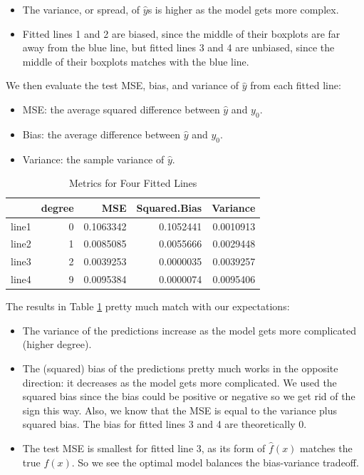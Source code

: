 \documentclass[
]{book}
\providecommand{\tightlist}{%
  \setlength{\itemsep}{0pt}\setlength{\parskip}{0pt}}
\begin{document}
\begin{itemize}
\tightlist
\item
  The variance, or spread, of \(\hat{y}\)s is higher as the model gets more complex.
\item
  Fitted lines 1 and 2 are biased, since the middle of their boxplots are far away from the blue line, but fitted lines 3 and 4 are unbiased, since the middle of their boxplots matches with the blue line.
\end{itemize}

We then evaluate the test MSE, bias, and variance of \(\hat{y}\) from each fitted line:

\begin{itemize}
\tightlist
\item
  MSE: the average squared difference between \(\hat{y}\) and \(y_0\).
\item
  Bias: the average difference between \(\hat{y}\) and \(y_0\).
\item
  Variance: the sample variance of \(\hat{y}\).
\end{itemize}

\begin{table}

\caption{\label{tab:10-table}Metrics for Four Fitted Lines}
\centering
\begin{tabular}[t]{l|r|r|r|r}
\hline
  & degree & MSE & Squared.Bias & Variance\\
\hline
line1 & 0 & 0.1063342 & 0.1052441 & 0.0010913\\
\hline
line2 & 1 & 0.0085085 & 0.0055666 & 0.0029448\\
\hline
line3 & 2 & 0.0039253 & 0.0000035 & 0.0039257\\
\hline
line4 & 9 & 0.0095384 & 0.0000074 & 0.0095406\\
\hline
\end{tabular}
\end{table}

The results in Table \ref{tab:10-table} pretty much match with our expectations:

\begin{itemize}
\tightlist
\item
  The variance of the predictions increase as the model gets more complicated (higher degree).
\item
  The (squared) bias of the predictions pretty much works in the opposite direction: it decreases as the model gets more complicated. We used the squared bias since the bias could be positive or negative so we get rid of the sign this way. Also, we know that the MSE is equal to the variance plus squared bias. The bias for fitted lines 3 and 4 are theoretically 0.
\item
  The test MSE is smallest for fitted line 3, as its form of \(\hat{f}(x)\) matches the true \(f(x)\). So we see the optimal model balances the bias-variance tradeoff.
\end{itemize}
\end{document}
